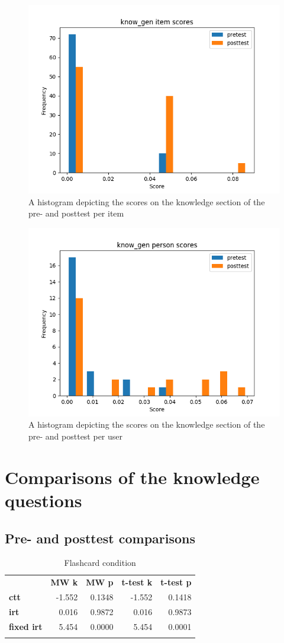 \begin{figure}
    \centering
    \includegraphics[width=.7\textwidth]{img/know_gen_diff.png}
    \caption{A histogram depicting the scores on the knowledge section of the pre- and posttest per item}
    \label{fig:know_gen_diff}
\end{figure}
\begin{figure}
    \centering
    \includegraphics[width=.7\textwidth]{img/know_gen_abil.png}
    \caption{A histogram depicting the scores on the knowledge section of the pre- and posttest per user}
    \label{fig:know_gen_abil}
\end{figure}

\FloatBarrier
\section{Comparisons of the knowledge questions}

\FloatBarrier
\subsection{Pre- and posttest comparisons}

\begin{longtable}[c]{@{}lrrrr@{}}
\caption{Flashcard condition}
\endfirsthead
\endhead
\toprule\addlinespace
& \textbf{MW k} & \textbf{MW p} &
\textbf{t-test k} & \textbf{t-test p}
\\\addlinespace
\midrule
\textbf{ctt} & -1.552 & 0.1348 & -1.552 & 0.1418
\\\addlinespace
\textbf{irt} & 0.016 & 0.9872 & 0.016 & 0.9873
\\\addlinespace
\textbf{fixed irt} & 5.454 & 0.0000 & 5.454 & 0.0001
\\\addlinespace
\bottomrule
    \label{tab:know_pp_fc_comp}
\end{longtable}

